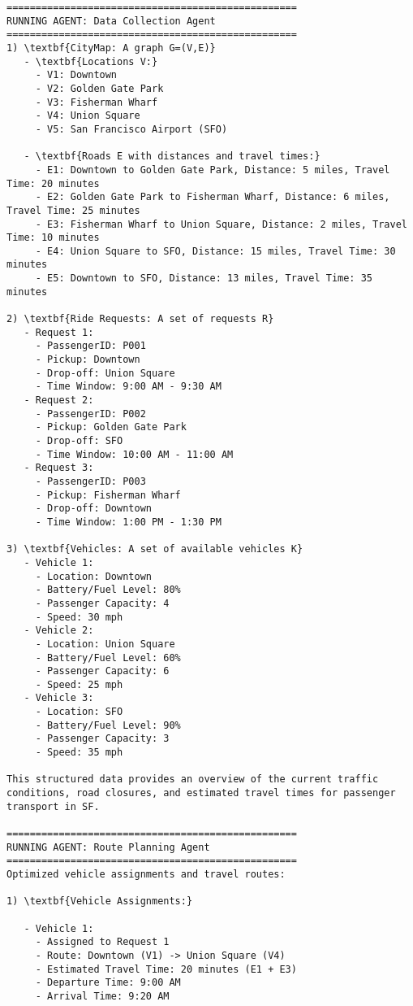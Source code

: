 \begin{lstlisting}[style=JSONStyle, caption=Sample JSON Output from Agentic Workflow, label=lst:data_collectionp3p4]
==================================================
RUNNING AGENT: Data Collection Agent
==================================================
1) \textbf{CityMap: A graph G=(V,E)}
   - \textbf{Locations V:}
     - V1: Downtown
     - V2: Golden Gate Park
     - V3: Fisherman Wharf
     - V4: Union Square
     - V5: San Francisco Airport (SFO)

   - \textbf{Roads E with distances and travel times:}
     - E1: Downtown to Golden Gate Park, Distance: 5 miles, Travel Time: 20 minutes
     - E2: Golden Gate Park to Fisherman Wharf, Distance: 6 miles, Travel Time: 25 minutes
     - E3: Fisherman Wharf to Union Square, Distance: 2 miles, Travel Time: 10 minutes
     - E4: Union Square to SFO, Distance: 15 miles, Travel Time: 30 minutes
     - E5: Downtown to SFO, Distance: 13 miles, Travel Time: 35 minutes

2) \textbf{Ride Requests: A set of requests R}
   - Request 1:
     - PassengerID: P001
     - Pickup: Downtown
     - Drop-off: Union Square
     - Time Window: 9:00 AM - 9:30 AM
   - Request 2:
     - PassengerID: P002
     - Pickup: Golden Gate Park
     - Drop-off: SFO
     - Time Window: 10:00 AM - 11:00 AM
   - Request 3:
     - PassengerID: P003
     - Pickup: Fisherman Wharf
     - Drop-off: Downtown
     - Time Window: 1:00 PM - 1:30 PM

3) \textbf{Vehicles: A set of available vehicles K}
   - Vehicle 1:
     - Location: Downtown
     - Battery/Fuel Level: 80%
     - Passenger Capacity: 4
     - Speed: 30 mph
   - Vehicle 2:
     - Location: Union Square
     - Battery/Fuel Level: 60%
     - Passenger Capacity: 6
     - Speed: 25 mph
   - Vehicle 3:
     - Location: SFO
     - Battery/Fuel Level: 90%
     - Passenger Capacity: 3
     - Speed: 35 mph

This structured data provides an overview of the current traffic conditions, road closures, and estimated travel times for passenger transport in SF.

================================================== 
RUNNING AGENT: Route Planning Agent
==================================================
Optimized vehicle assignments and travel routes:

1) \textbf{Vehicle Assignments:}

   - Vehicle 1:
     - Assigned to Request 1
     - Route: Downtown (V1) -> Union Square (V4)
     - Estimated Travel Time: 20 minutes (E1 + E3)
     - Departure Time: 9:00 AM
     - Arrival Time: 9:20 AM


\end{lstlisting}
